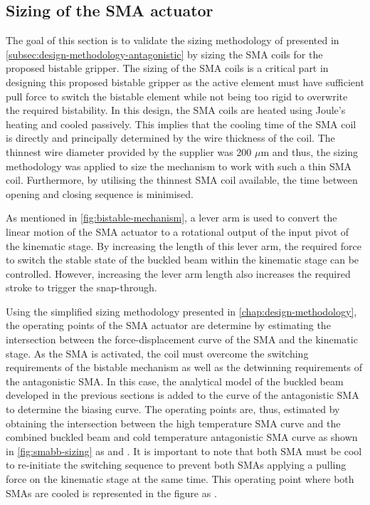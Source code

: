 \subsection{Sizing of the SMA actuator}
The goal of this section is to validate the sizing methodology of presented in \cref{subsec:design-methodology-antagonistic} by sizing the SMA coils for the proposed bistable gripper. The sizing of the SMA coils is a critical part in designing this proposed bistable gripper as the active element must have sufficient pull force to switch the bistable element while not being too rigid to overwrite the required bistability. In this design, the SMA coils are heated using Joule's heating and cooled passively. This implies that the cooling time of the SMA coil is directly and principally determined by the wire thickness of the coil. The thinnest wire diameter provided by the supplier was 200 $\mu$m and thus, the sizing methodology was applied to size the mechanism to work with such a thin SMA coil. Furthermore, by utilising the thinnest SMA coil available, the time between opening and closing sequence is minimised.

As mentioned in \cref{fig:bistable-mechanism}, a lever arm is used to convert the linear motion of the SMA actuator to a rotational output of the input pivot of the kinematic stage. By increasing the length of this lever arm, the required force to switch the stable state of the buckled beam within the kinematic stage can be controlled. However, increasing the lever arm length also increases the required stroke to trigger the snap-through.

Using the simplified sizing methodology presented in \cref{chap:design-methodology}, the operating points of the SMA actuator are determine by estimating the intersection between the force-displacement curve of the SMA and the kinematic stage. As the SMA is activated, the coil must overcome the switching requirements of the bistable mechanism as well as the detwinning requirements of the antagonistic SMA. In this case, the analytical model of the buckled beam developed in the previous sections is added to the curve of the antagonistic SMA to determine the biasing curve. The operating points are, thus, estimated by obtaining the intersection between the high temperature SMA curve and the combined buckled beam and cold temperature antagonistic SMA curve as shown in \cref{fig:smabb-sizing} as  and . It is important to note that both SMA must be cool to re-initiate the switching sequence to prevent both SMAs applying a pulling force on the kinematic stage at the same time. This operating point where both SMAs are cooled is represented in the figure as .

